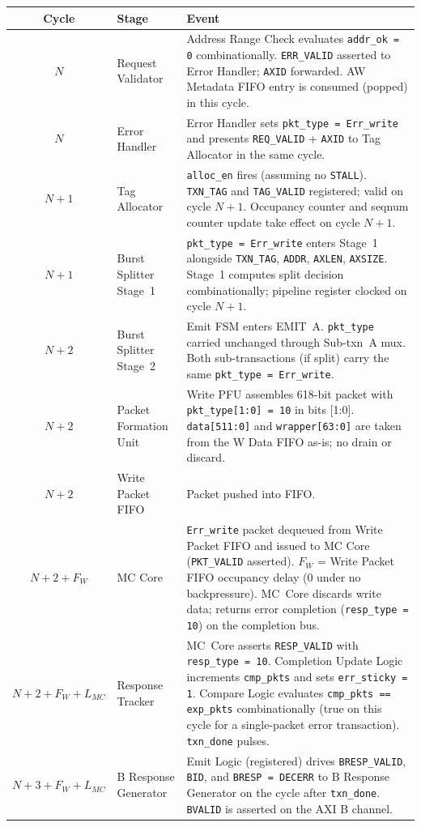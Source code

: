 \begin{center}
\begin{tabular}{clL{9cm}}
\toprule
\textbf{Cycle} & \textbf{Stage} & \textbf{Event} \\
\midrule
$N$   & Request Validator & Address Range Check evaluates \texttt{addr\_ok = 0} combinationally. \texttt{ERR\_VALID} asserted to Error Handler; \texttt{AXID} forwarded. AW Metadata FIFO entry is consumed (popped) in this cycle. \\
$N$   & Error Handler     & Error Handler sets \texttt{pkt\_type = Err\_write} and presents \texttt{REQ\_VALID} + \texttt{AXID} to Tag Allocator in the same cycle. \\
$N+1$ & Tag Allocator     & \texttt{alloc\_en} fires (assuming no \texttt{STALL}). \texttt{TXN\_TAG} and \texttt{TAG\_VALID} registered; valid on cycle $N+1$. Occupancy counter and seqnum counter update take effect on cycle $N+1$. \\
$N+1$ & Burst Splitter Stage~1 & \texttt{pkt\_type = Err\_write} enters Stage~1 alongside \texttt{TXN\_TAG}, \texttt{ADDR}, \texttt{AXLEN}, \texttt{AXSIZE}. Stage~1 computes split decision combinationally; pipeline register clocked on cycle $N+1$. \\
$N+2$ & Burst Splitter Stage~2 & Emit FSM enters \textsc{EMIT~A}. \texttt{pkt\_type} carried unchanged through Sub-txn~A mux. Both sub-transactions (if split) carry the same \texttt{pkt\_type = Err\_write}. \\
$N+2$ & Packet Formation Unit & Write PFU assembles 618-bit packet with \texttt{pkt\_type[1:0] = 10} in bits [1:0]. \texttt{data[511:0]} and \texttt{wrapper[63:0]} are taken from the W Data FIFO as-is; no drain or discard. \\
$N+2$ & Write Packet FIFO & Packet pushed into FIFO. \\
$N+2 + F_W$ & MC Core & \texttt{Err\_write} packet dequeued from Write Packet FIFO and issued to MC Core (\texttt{PKT\_VALID} asserted). $F_W$ = Write Packet FIFO occupancy delay (0 under no backpressure). MC~Core discards write data; returns error completion (\texttt{resp\_type = 10}) on the completion bus. \\
$N+2 + F_W + L_{MC}$ & Response Tracker & MC~Core asserts \texttt{RESP\_VALID} with \texttt{resp\_type = 10}. Completion Update Logic increments \texttt{cmp\_pkts} and sets \texttt{err\_sticky = 1}. Compare Logic evaluates \texttt{cmp\_pkts == exp\_pkts} combinationally (true on this cycle for a single-packet error transaction). \texttt{txn\_done} pulses. \\
$N+3 + F_W + L_{MC}$ & B Response Generator & Emit Logic (registered) drives \texttt{BRESP\_VALID}, \texttt{BID}, and \texttt{BRESP = DECERR} to B Response Generator on the cycle after \texttt{txn\_done}. \texttt{BVALID} is asserted on the AXI B channel. \\
\bottomrule
\end{tabular}
\end{center}

